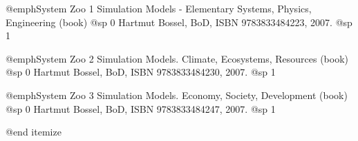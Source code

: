 \item
@emph{System Zoo 1 Simulation Models - Elementary Systems, Physics, Engineering} (book)
@sp 0
Hartmut Bossel, BoD, ISBN 9783833484223, 2007.
@sp 1

\item
@emph{System Zoo 2 Simulation Models. Climate, Ecosystems, Resources} (book)
@sp 0
Hartmut Bossel, BoD, ISBN 9783833484230, 2007.
@sp 1

\item
@emph{System Zoo 3 Simulation Models. Economy, Society, Development} (book)
@sp 0
Hartmut Bossel, BoD, ISBN 9783833484247, 2007.
@sp 1

@end itemize

